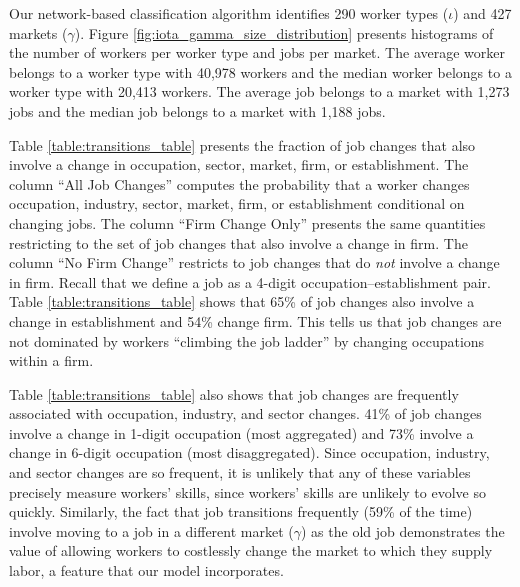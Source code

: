 \documentclass[12pt]{article}
\def\g{\gamma}
\def\i{\iota}
\theoremstyle{definition}
\theoremstyle{plain}
\begin{document}
Our network-based classification algorithm identifies 290 worker types ($\i$) and 427 markets ($\g$). Figure \ref{fig:iota_gamma_size_distribution} presents histograms of the number of workers per worker type and jobs per market. The average worker belongs to a worker type with 40,978 workers and the median worker belongs to a worker type with 20,413 workers. The average job belongs to a market with 1,273 jobs and the median job belongs to a market with 1,188 jobs. 

Table \ref{table:transitions_table} presents the fraction of job changes that also involve a change in occupation, sector, market, firm, or establishment. The column ``All Job Changes'' computes the probability that a worker changes occupation, industry, sector, market, firm, or establishment conditional on changing jobs. The column ``Firm Change Only'' presents the same quantities restricting to the set of job changes that also involve a change in firm. The column ``No Firm Change'' restricts to job changes that do \emph{not} involve a change in firm. Recall that we define a job as a 4-digit occupation--establishment pair. Table \ref{table:transitions_table} shows that 65\% of job changes also involve a change in establishment and 54\% change firm. This tells us that job changes are not dominated by workers ``climbing the job ladder'' by changing occupations within a firm. 

Table \ref{table:transitions_table} also shows that job changes are frequently associated with occupation, industry, and sector changes. 41\% of job changes involve a change in 1-digit occupation (most aggregated) and 73\% involve a change in 6-digit occupation (most disaggregated). Since occupation, industry, and sector changes are so frequent, it is unlikely that any of these variables precisely measure workers' skills, since workers' skills are unlikely to evolve so quickly. Similarly, the fact that job transitions frequently (59\% of the time) involve moving to a job in a different market ($\g$) as the old job demonstrates the value of allowing workers to costlessly change the market to which they supply labor, a feature that our model incorporates. 
\end{document}
